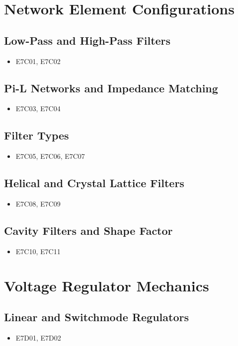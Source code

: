 \documentclass{book}
\begin{document}
\section{Network Element Configurations}
\subsection{Low-Pass and High-Pass Filters}
\begin{itemize}
    \item E7C01, E7C02
\end{itemize}
\subsection{Pi-L Networks and Impedance Matching}
\begin{itemize}
    \item E7C03, E7C04
\end{itemize}
\subsection{Filter Types}
\begin{itemize}
    \item E7C05, E7C06, E7C07
\end{itemize}
\subsection{Helical and Crystal Lattice Filters}
\begin{itemize}
    \item E7C08, E7C09
\end{itemize}
\subsection{Cavity Filters and Shape Factor}
\begin{itemize}
    \item E7C10, E7C11
\end{itemize}

\section{Voltage Regulator Mechanics}
\subsection{Linear and Switchmode Regulators}
\begin{itemize}
    \item E7D01, E7D02
\end{itemize}
\end{document}
